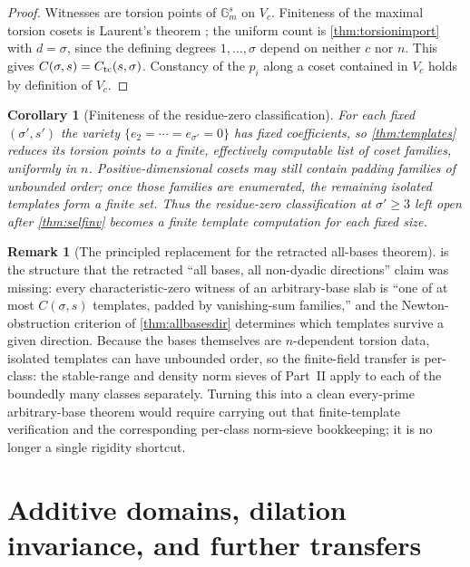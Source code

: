 \documentclass[11pt]{article}
\newtheorem{corollary}[corollary]{Corollary}
\theoremstyle{definition}
\newtheorem{remark}[remark]{Remark}
\begin{document}
\begin{proof}
Witnesses are torsion points of $\mathbb G_m^s$ on $V_c$.  Finiteness of the maximal torsion cosets is Laurent's theorem \cite{Laurent84}; the uniform count is \cref{thm:torsionimport} with $d=\sigma$, since the defining degrees $1,\dots,\sigma$ depend on neither $c$ nor $n$.  This gives $C(\sigma,s)=C_{\rm tc}(s,\sigma)$.  Constancy of the $p_i$ along a coset contained in $V_c$ holds by definition of $V_c$.
\end{proof}

\begin{corollary}[Finiteness of the residue-zero classification]\label{cor:reszero}
For each fixed $(\sigma',s')$ the variety $\{e_2=\cdots=e_{\sigma'}=0\}$ has fixed coefficients, so \cref{thm:templates} reduces its torsion points to a finite, effectively computable list of coset families, uniformly in $n$.  Positive-dimensional cosets may still contain padding families of unbounded order; once those families are enumerated, the remaining isolated templates form a finite set.  Thus the residue-zero classification at $\sigma'\ge3$ left open after \cref{thm:selfinv} becomes a finite template computation for each fixed size.
\end{corollary}

\begin{remark}[The principled replacement for the retracted all-bases theorem]\label{rem:templaterepair}
 is the structure that the retracted ``all bases, all non-dyadic directions'' claim was missing: every characteristic-zero witness of an arbitrary-base slab is ``one of at most $C(\sigma,s)$ templates, padded by vanishing-sum families,'' and the Newton-obstruction criterion of \cref{thm:allbasesdir} determines which templates survive a given direction.  Because the bases themselves are $n$-dependent torsion data, isolated templates can have unbounded order, so the finite-field transfer is per-class: the stable-range and density norm sieves of Part~II apply to each of the boundedly many classes separately.  Turning this into a clean every-prime arbitrary-base theorem would require carrying out that finite-template verification and the corresponding per-class norm-sieve bookkeeping; it is no longer a single rigidity shortcut.
\end{remark}

\section{Additive domains, dilation invariance, and further transfers}\label{sec:further}
\end{document}
